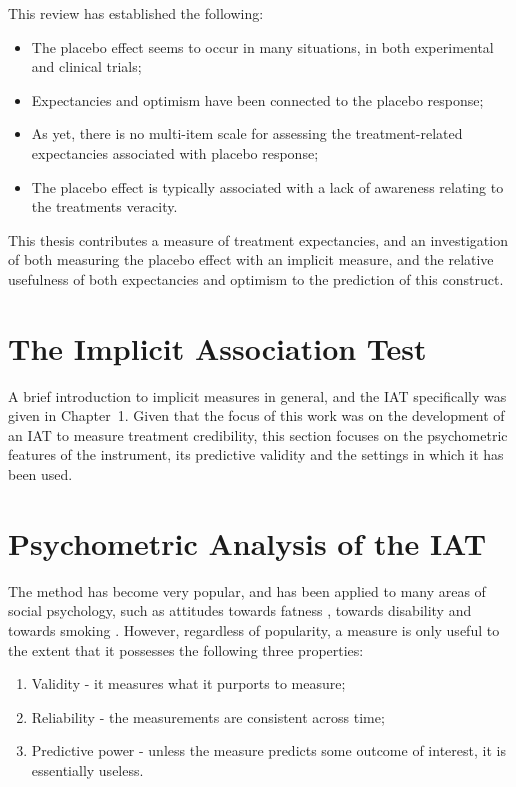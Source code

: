 This review has established the following:

\begin{itemize}
\item The placebo effect seems to occur in many situations, in both experimental and clinical trials;
\item Expectancies and optimism have been connected to the placebo response;
\item As yet, there is no multi-item scale for assessing the treatment-related expectancies associated with placebo response;
\item The placebo effect is typically associated with a lack of awareness relating to the treatments veracity.
\end{itemize}

This thesis contributes a measure of treatment expectancies, and an investigation of both measuring the placebo effect with an implicit measure, and the relative usefulness of both expectancies and optimism to the prediction of this construct. 

\section{The Implicit Association Test}
\label{sec:impl-assoc-test}

A brief introduction to implicit measures in general, and the IAT specifically was given in Chapter~1. Given that the focus of this work was on the development of an IAT to measure treatment credibility, this section focuses on the psychometric features of the instrument, its predictive validity and the settings in which it has been used. 


\section{Psychometric Analysis of the IAT}
\label{sec:uses-psych-feat}

The method has become very popular, and has been applied to many areas of social psychology, such as attitudes towards fatness \cite{Ahern2008}, towards disability \cite{Pruett2006} and towards smoking \cite{Kahler2007}. However, regardless of popularity, a measure is only useful to the extent that it possesses the following three properties:


\begin{enumerate}
\item Validity - it measures what it purports to measure;
\item Reliability - the measurements are consistent across time;
\item Predictive power - unless the measure predicts some outcome of interest, it is essentially useless.
\end{enumerate}

